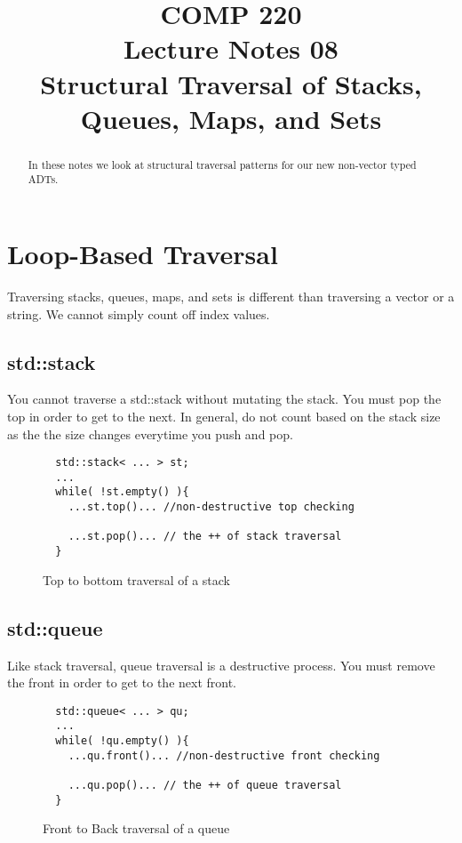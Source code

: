 \documentclass[nobib]{tufte-handout}
\title{COMP 220 \\ Lecture Notes 08 \\ Structural Traversal of Stacks, Queues, Maps, and Sets}
\begin{document}
\maketitle

\begin{abstract}
In these notes we look at structural traversal patterns for our new non-vector typed ADTs.
\end{abstract}

\section{Loop-Based Traversal}

Traversing stacks, queues, maps, and sets is different than traversing a vector or a string. We cannot simply count off index values.


\subsection{std::stack}

You cannot traverse a std::stack without mutating the stack.  You must pop the top in order to get to the next.  In general, do not count based on the stack size as the the size changes everytime you push and pop.

\begin{figure}[!htbp]
\begin{lstlisting}
  std::stack< ... > st;
  ...
  while( !st.empty() ){
    ...st.top()... //non-destructive top checking

    ...st.pop()... // the ++ of stack traversal
  }
\end{lstlisting}
\caption{Top to bottom traversal of a stack}
\end{figure}


\subsection{std::queue}

Like stack traversal, queue traversal is a destructive process. You must remove the front in order to get to the next front.

\begin{figure}[!htbp]
\begin{lstlisting}
  std::queue< ... > qu;
  ...
  while( !qu.empty() ){
    ...qu.front()... //non-destructive front checking

    ...qu.pop()... // the ++ of queue traversal
  }
\end{lstlisting}
\caption{Front to Back traversal of a queue}
\end{figure}
\end{document}
